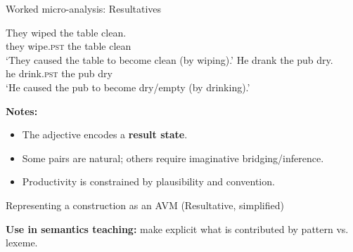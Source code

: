 \begin{frame}{Worked micro-analysis: Resultatives}
\small

\begin{exe}
  \ex \gll They wiped the table clean.\\
      they wipe.\textsc{pst} the table clean\\
      \glt `They caused the table to become clean (by wiping).'
  \ex \gll He drank the pub dry.\\
      he drink.\textsc{pst} the pub dry\\
      \glt `He caused the pub to become dry/empty (by drinking).'
\end{exe}


\vspace{0.5em}
\textbf{Notes:}
\begin{itemize}
  \item The adjective encodes a \textbf{result state}.
  \item Some pairs are natural; others require imaginative bridging/inference.
  \item Productivity is constrained by plausibility and convention.
\end{itemize}
\end{frame}

\begin{frame}{Representing a construction as an AVM (Resultative, simplified)}
\small

\vspace{0.5em}
\textbf{Use in semantics teaching:} make explicit what is contributed by pattern vs. lexeme.
\end{frame}

